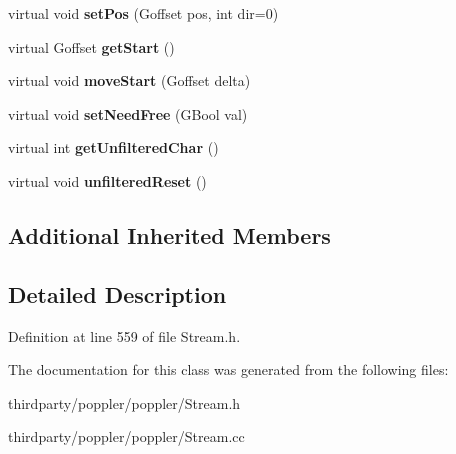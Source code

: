 \begin{DoxyCompactItemize}
virtual void {\bfseries set\+Pos} (Goffset pos, int dir=0)
\item 
\mbox{\label{class_mem_stream_aa65556633b47f57722c14c026197cd13}} 
virtual Goffset {\bfseries get\+Start} ()
\item 
\mbox{\label{class_mem_stream_a3e7906e7485272b520cb2e429a711257}} 
virtual void {\bfseries move\+Start} (Goffset delta)
\item 
\mbox{\label{class_mem_stream_aa7c50a10ac5cdc542e0e95f9a4b77bc3}} 
virtual void {\bfseries set\+Need\+Free} (G\+Bool val)
\item 
\mbox{\label{class_mem_stream_aa8ebdf9fc1224f18977640515bc1d449}} 
virtual int {\bfseries get\+Unfiltered\+Char} ()
\item 
\mbox{\label{class_mem_stream_a9f15a82c7c2f5a1d0582dbed138d5139}} 
virtual void {\bfseries unfiltered\+Reset} ()
\end{DoxyCompactItemize}
\subsection*{Additional Inherited Members}


\subsection{Detailed Description}


Definition at line 559 of file Stream.\+h.



The documentation for this class was generated from the following files\+:\begin{DoxyCompactItemize}
\item 
thirdparty/poppler/poppler/Stream.\+h\item 
thirdparty/poppler/poppler/Stream.\+cc\end{DoxyCompactItemize}
